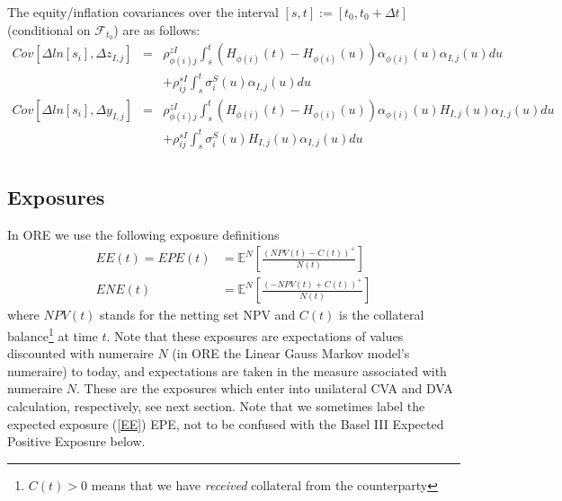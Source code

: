 \documentclass[12pt, a4paper]{article}
\newcommand\E{\ensuremath{\mathbb{E}}}
\newcommand{\NPV}{\mathit{NPV}}
\newcommand{\EE}{\mathit{EE}}
\newcommand{\EPE}{\mathit{EPE}}
\newcommand{\ENE}{\mathit{ENE}}
\begin{document}
\begin{appendix}
The equity/inflation covariances over the interval $[s,t] := [t_0, t_0+\Delta t]$ (conditional on $\mathcal{F}_{t_0}$) are as follows:
\begin{eqnarray*}
	Cov \left[\Delta ln[s_i], \Delta z_{I,j} \right] &=&
	\rho_{\phi(i)j}^{zI} \int_s^t (H_{\phi(i)} (t) - H_{\phi(i)} (u)) \alpha_{\phi(i)} (u) \alpha_{I,j} (u) du\\
	&&+ \rho_{ij}^{sI} \int_s^t \sigma_i^S (u) \alpha_{I,j} (u) du\\	
	Cov \left[\Delta ln[s_i], \Delta y_{I,j} \right] &=&
	\rho_{\phi(i)j}^{zI} \int_s^t (H_{\phi(i)} (t) - H_{\phi(i)} (u)) \alpha_{\phi(i)} (u) H_{I,j} (u) \alpha_{I,j} (u) du\\
	&&+ \rho_{ij}^{sI} \int_s^t \sigma_i^S (u) H_{I,j} (u) \alpha_{I,j} (u) du\\
\end{eqnarray*}



\subsection{Exposures}\label{sec:app_exposure}

In ORE we use the following exposure definitions
\begin{align}
\EE(t) = \EPE(t) &= \E^N\left[ \frac{(NPV(t)-C(t))^+}{N(t)} \right] \label{EE}\\
\ENE(t) &= \E^N\left[ \frac{(-NPV(t)+C(t))^+}{N(t)} \right] \label{ENE}
\end{align}
where $\NPV(t)$ stands for the netting set NPV and $C(t)$ is the collateral balance\footnote{$C(t)>0$ means that we have
  {\em received} collateral from the counterparty} at time $t$. Note that these exposures are expectations of values
discounted with numeraire $N$ (in ORE the Linear Gauss Markov model's numeraire) to today, and expectations are taken in
the measure associated with numeraire $N$. These are the exposures which enter into unilateral CVA and DVA calculation,
respectively, see next section. Note that we sometimes label the expected exposure (\ref{EE}) EPE, not to be confused
with the Basel III Expected Positive Exposure below.


\end{appendix}
\end{document}
